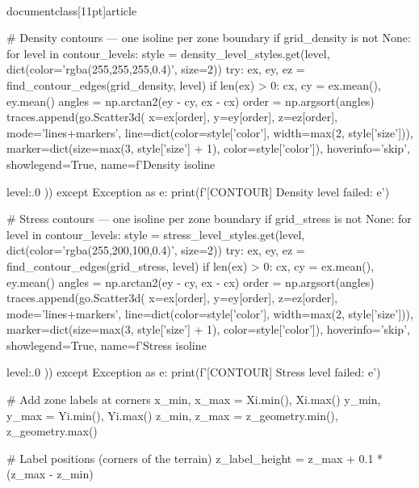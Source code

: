\\documentclass[11pt]{article}
\begin{document}
\begin{CodeBlock}
    # Density contours — one isoline per zone boundary
    if grid_density is not None:
        for level in contour_levels:
            style = density_level_styles.get(level, dict(color='rgba(255,255,255,0.4)', size=2))
            try:
                ex, ey, ez = find_contour_edges(grid_density, level)
                if len(ex) > 0:
                    cx, cy = ex.mean(), ey.mean()
                    angles = np.arctan2(ey - cy, ex - cx)
                    order = np.argsort(angles)
                    traces.append(go.Scatter3d(
                        x=ex[order], y=ey[order], z=ez[order],
                        mode='lines+markers',
                        line=dict(color=style['color'], width=max(2, style['size'])),
                        marker=dict(size=max(3, style['size'] + 1), color=style['color']),
                        hoverinfo='skip',
                        showlegend=True,
                        name=f'Density isoline {level:.0%
                    ))
            except Exception as e:
                print(f'[CONTOUR] Density {level} failed: {e}')

    # Stress contours — one isoline per zone boundary
    if grid_stress is not None:
        for level in contour_levels:
            style = stress_level_styles.get(level, dict(color='rgba(255,200,100,0.4)', size=2))
            try:
                ex, ey, ez = find_contour_edges(grid_stress, level)
                if len(ex) > 0:
                    cx, cy = ex.mean(), ey.mean()
                    angles = np.arctan2(ey - cy, ex - cx)
                    order = np.argsort(angles)
                    traces.append(go.Scatter3d(
                        x=ex[order], y=ey[order], z=ez[order],
                        mode='lines+markers',
                        line=dict(color=style['color'], width=max(2, style['size'])),
                        marker=dict(size=max(3, style['size'] + 1), color=style['color']),
                        hoverinfo='skip',
                        showlegend=True,
                        name=f'Stress isoline {level:.0%
                    ))
            except Exception as e:
                print(f'[CONTOUR] Stress {level} failed: {e}')

    # Add zone labels at corners
    x_min, x_max = Xi.min(), Xi.max()
    y_min, y_max = Yi.min(), Yi.max()
    z_min, z_max = z_geometry.min(), z_geometry.max()

    # Label positions (corners of the terrain)
    z_label_height = z_max + 0.1 * (z_max - z_min)

}}
\end{CodeBlock}
\end{document}
